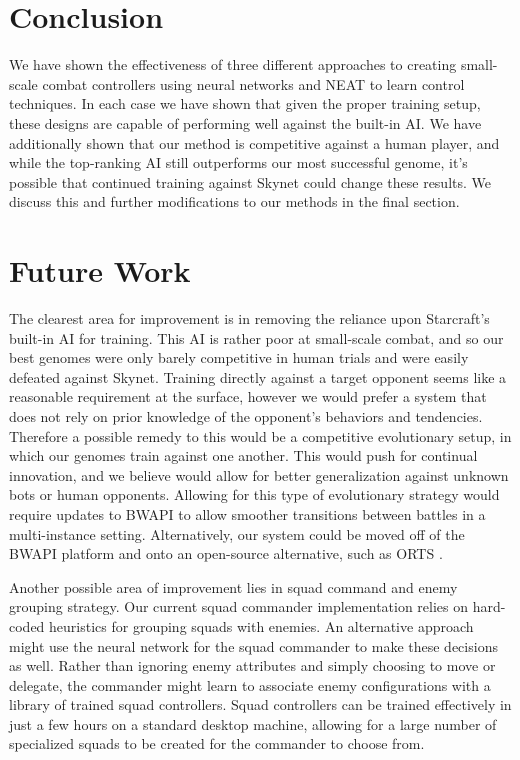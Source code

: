 \documentclass[10pt,a4paper,twocolumn]{article}
\begin{document}
\section{Conclusion}
\label{sec:conclusion}

We have shown the effectiveness of three different approaches to creating small-scale combat controllers using neural networks and NEAT to learn control techniques. In each case we have shown that given the proper training setup, these designs are capable of performing well against the built-in AI. We have additionally shown that our method is competitive against a human player, and while the top-ranking AI still outperforms our most successful genome, it's possible that continued training against Skynet could change these results. We discuss this and further modifications to our methods in the final section.

\section{Future Work}
\label{sec:future}

The clearest area for improvement is in removing the reliance upon Starcraft's built-in AI for training. This AI is rather poor at small-scale combat, and so our best genomes were only barely competitive in human trials and were easily defeated against Skynet. Training directly against a target opponent seems like a reasonable requirement at the surface, however we would prefer a system that does not rely on prior knowledge of the opponent's behaviors and tendencies. Therefore a possible remedy to this would be a competitive evolutionary setup, in which our genomes train against one another. This would push for continual innovation, and we believe would allow for better generalization against unknown bots or human opponents. Allowing for this type of evolutionary strategy would require updates to BWAPI to allow smoother transitions between battles in a multi-instance setting. Alternatively, our system could be moved off of the BWAPI platform and onto an open-source alternative, such as ORTS \cite{orts}.

Another possible area of improvement lies in squad command and enemy grouping strategy. Our current squad commander implementation relies on hard-coded heuristics for grouping squads with enemies. An alternative approach might use the neural network for the squad commander to make these decisions as well. Rather than ignoring enemy attributes and simply choosing to move or delegate, the commander might learn to associate enemy configurations with a library of trained squad controllers. Squad controllers can be trained effectively in just a few hours on a standard desktop machine, allowing for a large number of specialized squads to be created for the commander to choose from.
\end{document}
